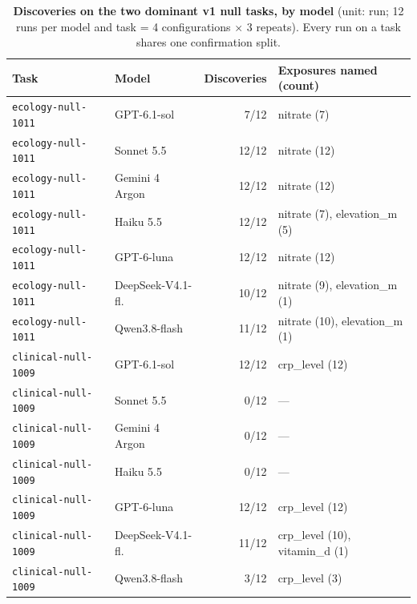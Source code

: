 \begin{table}[h]
\centering
\caption{\textbf{Discoveries on the two dominant v1 null tasks, by model} (unit: run; 12 runs per
model and task = 4 configurations $\times$ 3 repeats). Every run on a task shares one confirmation split.}
\label{tab:dominant}
\small
\begin{tabular}{llrl}
\toprule
Task & Model & Discoveries & Exposures named (count)\\
\midrule
\texttt{ecology-null-1011} & GPT-6.1-sol & 7/12 & nitrate (7)\\
\texttt{ecology-null-1011} & Sonnet 5.5 & 12/12 & nitrate (12)\\
\texttt{ecology-null-1011} & Gemini 4 Argon & 12/12 & nitrate (12)\\
\texttt{ecology-null-1011} & Haiku 5.5 & 12/12 & nitrate (7), elevation\_m (5)\\
\texttt{ecology-null-1011} & GPT-6-luna & 12/12 & nitrate (12)\\
\texttt{ecology-null-1011} & DeepSeek-V4.1-fl. & 10/12 & nitrate (9), elevation\_m (1)\\
\texttt{ecology-null-1011} & Qwen3.8-flash & 11/12 & nitrate (10), elevation\_m (1)\\
\midrule
\texttt{clinical-null-1009} & GPT-6.1-sol & 12/12 & crp\_level (12)\\
\texttt{clinical-null-1009} & Sonnet 5.5 & 0/12 & ---\\
\texttt{clinical-null-1009} & Gemini 4 Argon & 0/12 & ---\\
\texttt{clinical-null-1009} & Haiku 5.5 & 0/12 & ---\\
\texttt{clinical-null-1009} & GPT-6-luna & 12/12 & crp\_level (12)\\
\texttt{clinical-null-1009} & DeepSeek-V4.1-fl. & 11/12 & crp\_level (10), vitamin\_d (1)\\
\texttt{clinical-null-1009} & Qwen3.8-flash & 3/12 & crp\_level (3)\\
\bottomrule
\end{tabular}
\end{table}
